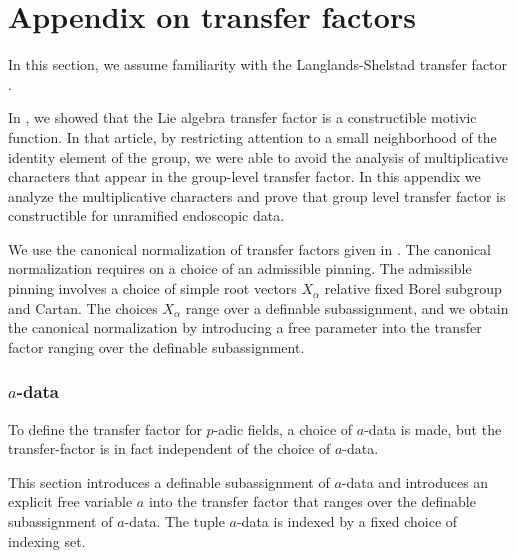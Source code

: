 \section{Appendix on transfer factors}

In this section, we assume familiarity with the Langlands-Shelstad
transfer factor \cite{langlands1987definition}.

In \cite{gordon}, we showed that the Lie algebra transfer factor is a
constructible motivic function.  In that article, by restricting
attention to a small neighborhood of the identity element of the
group, we were able to avoid the analysis of multiplicative characters
that appear in the group-level transfer factor.  In this appendix we
analyze the multiplicative characters and prove that group level
transfer factor is constructible for unramified endoscopic data.

We use the canonical normalization of transfer factors given in
\cite[\S7]{hales1993simple}.  The canonical normalization requires on
a choice of an admissible pinning.  The admissible pinning involves a
choice of simple root vectors $X_\alpha$ relative fixed Borel subgroup
and Cartan.  The choices $X_\alpha$ range over a definable
subassignment, and we obtain the canonical normalization by
introducing a free parameter into the transfer factor ranging over the
definable subassignment.

\subsubsection{$a$-data}

To define the transfer factor for $p$-adic fields, a choice of
$a$-data is made, but the transfer-factor is in fact independent of
the choice of $a$-data.

This section introduces a definable subassignment of $a$-data and
introduces an explicit free variable $a$ into the transfer factor that
ranges over the definable subassignment of $a$-data.  The tuple
$a$-data is indexed by a fixed choice of indexing set.

